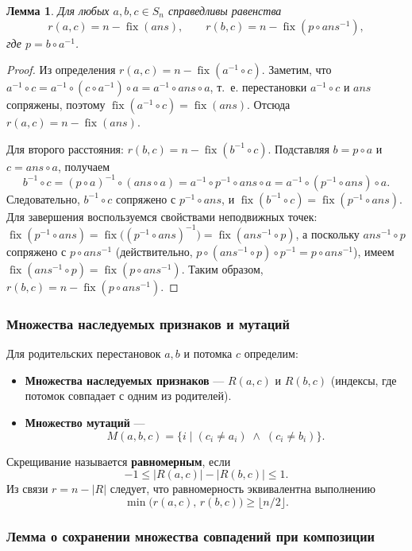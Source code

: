 \documentclass[732]{studrep}
\DeclareMathOperator{\fix}{fix}          %
\newcommand{\ans}{\mathit{ans}}          %
\newtheorem{lemma}[theorem]{Лемма}
\theoremstyle{nonumberplain}
\newtheorem{proof}{Доказательство}
\begin{document}
\begin{lemma}\label{lem:dist}
Для любых $a,b,c\in S_n$ справедливы равенства
\[
r(a,c)=n-\fix(\ans),\qquad r(b,c)=n-\fix(p\circ \ans^{-1}),
\]
где $p=b\circ a^{-1}$.
\end{lemma}
\begin{proof}
Из определения $r(a,c)=n-\fix(a^{-1}\circ c)$. Заметим, что
$a^{-1}\circ c = a^{-1}\circ (c\circ a^{-1})\circ a = a^{-1}\circ \ans\circ a$,
т.~е. перестановки $a^{-1}\circ c$ и $\ans$ сопряжены, поэтому
$\fix(a^{-1}\circ c)=\fix(\ans)$. Отсюда $r(a,c)=n-\fix(\ans)$.

Для второго расстояния:
$r(b,c)=n-\fix(b^{-1}\circ c)$. Подставляя $b = p\circ a$ и
$c = \ans\circ a$, получаем
\[
b^{-1}\circ c = (p\circ a)^{-1}\circ (\ans\circ a)
= a^{-1}\circ p^{-1}\circ \ans\circ a
= a^{-1}\circ (p^{-1}\circ \ans)\circ a.
\]
Следовательно, $b^{-1}\circ c$ сопряжено с $p^{-1}\circ \ans$, и
$\fix(b^{-1}\circ c)=\fix(p^{-1}\circ \ans)$.
Для завершения воспользуемся свойствами неподвижных точек:
$\fix(p^{-1}\circ \ans) = \fix\big((p^{-1}\circ \ans)^{-1}\big) = \fix(\ans^{-1}\circ p)$,
а поскольку $\ans^{-1}\circ p$ сопряжено с $p\circ \ans^{-1}$
(действительно, $p\circ (\ans^{-1}\circ p)\circ p^{-1} = p\circ \ans^{-1}$),
имеем $\fix(\ans^{-1}\circ p) = \fix(p\circ \ans^{-1})$.
Таким образом, $r(b,c)=n-\fix(p\circ \ans^{-1})$.
\end{proof}

\subsubsection*{Множества наследуемых признаков и мутаций}

Для родительских перестановок $a,b$ и потомка $c$ определим:
\begin{itemize}
\item \textbf{Множества наследуемых признаков} — $R(a,c)$ и $R(b,c)$ (индексы, где потомок совпадает с одним из родителей).
\item \textbf{Множество мутаций} —
  \[
  M(a,b,c) = \{i \mid (c_i\neq a_i) \;\land\; (c_i\neq b_i)\}.
  \]
\end{itemize}

Скрещивание называется \textbf{равномерным}, если
\[
-1 \le |R(a,c)| - |R(b,c)| \le 1.
\]
Из связи $r = n-|R|$ следует, что равномерность эквивалентна выполнению
\[
\min\bigl(r(a,c),\,r(b,c)\bigr) \ge \lfloor n/2\rfloor.
\]

\subsubsection*{Лемма о сохранении множества совпадений при композиции}
\end{document}
